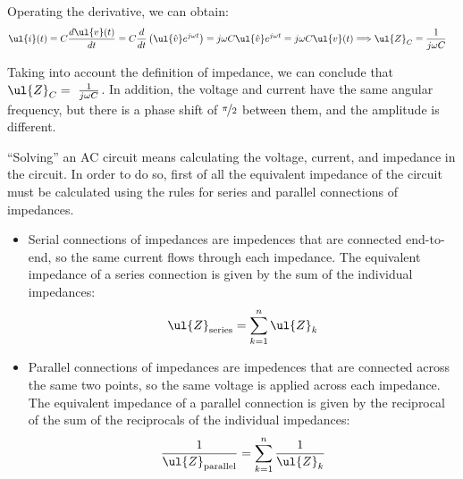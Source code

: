 \begin{itemize}
    Operating the derivative, we can obtain:
    \begin{align*}
        \ul{i}(t) &= C \frac{d\ul{v}(t)}{dt}
        = C \frac{d}{dt} \left( \ul{\hat{v}} e^{j\omega t} \right)
        = j\omega C \ul{\hat{v}} e^{j\omega t}
        = j\omega C \ul{v}(t)
        \Longrightarrow
        \ul{Z}_C = \frac{1}{j\omega C}
    \end{align*}

    Taking into account the definition of impedance, we can conclude that $\ul{Z}_C=~\frac{1}{j\omega C}$. In addition, the voltage and current have the same angular frequency, but there is a phase shift of $\nicefrac{\pi}{2}$ between them, and the amplitude is different.
\end{itemize}


``Solving'' an AC circuit means calculating the voltage, current, and impedance in the circuit. In order to do so, first of all the equivalent impedance of the circuit must be calculated using the rules for series and parallel connections of impedances.
\begin{itemize}
    \item Serial connections of impedances are impedences that are connected end-to-end, so the same current flows through each impedance. The equivalent impedance of a series connection is given by the sum of the individual impedances:
    \begin{equation*}
        \ul{Z}_{\text{series}} = \sum_{k=1}^n \ul{Z}_k
    \end{equation*}
    \item Parallel connections of impedances are impedences that are connected across the same two points, so the same voltage is applied across each impedance. The equivalent impedance of a parallel connection is given by the reciprocal of the sum of the reciprocals of the individual impedances:
    \begin{equation*}
        \dfrac{1}{\ul{Z}_{\text{parallel}}} = \sum_{k=1}^n \frac{1}{\ul{Z}_k}
    \end{equation*}
\end{itemize}

